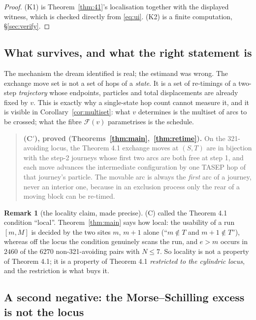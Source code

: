 \documentclass[11pt]{article}
\theoremstyle{plain}
\theoremstyle{definition}
\newtheorem{rem}[thm]{Remark}
\begin{document}
\begin{proof}
(K1) is Theorem~\ref{thm:41}'s localisation together with the displayed witness, which is
checked directly from \eqref{eq:ui}. (K2) is a finite computation, \S\ref{sec:verify}.
\end{proof}

\subsection{What survives, and what the right statement is}

The mechanism the dream identified is real; the estimand was wrong. The exchange move set is
not a set of hops of a \emph{state}. It is a set of re-timings of a two-step \emph{trajectory}
whose endpoints, particles and total displacements are already fixed by $v$. This is exactly
why a single-state hop count cannot measure it, and it is visible in
Corollary~\ref{cor:multiset}: what $v$ determines is the multiset of arcs to be crossed; what
the fibre $\mathcal{F}(v)$ parametrises is the schedule.

\begin{quote}
\textbf{(C$'$), proved (Theorems~\ref{thm:main},~\ref{thm:retime}).} On the 321-avoiding locus,
the Theorem 4.1 exchange moves at $(S,T)$ are in bijection with the step-2 journeys whose first
two arcs are both free at step 1, and each move advances the intermediate configuration by one
TASEP hop of that journey's particle. The movable arc is always the \emph{first} arc of a
journey, never an interior one, because in an exclusion process only the rear of a moving block
can be re-timed.
\end{quote}

\begin{rem}[the locality claim, made precise]
(C) called the Theorem 4.1 condition ``local''. Theorem~\ref{thm:main} says how local: the
usability of a run $[m,M]$ is decided by the two sites $m$, $m+1$ alone
(``$m\notin T$ and $m+1\notin T$''), whereas off the locus the condition genuinely scans the
run, and $e>m$ occurs in $2460$ of the $6270$ non-321-avoiding pairs with $N\le7$. So locality
is not a property of Theorem 4.1; it is a property of Theorem 4.1 \emph{restricted to the
cylindric locus}, and the restriction is what buys it.
\end{rem}

\subsection{A second negative: the Morse--Schilling excess is not the locus}
\end{document}
